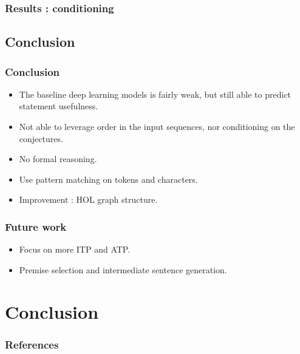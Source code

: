 \documentclass[11pt,handout]{beamer}
\begin{document}
\begin{frame}
  \frametitle{Results : conditioning}
  \begin{figure}[h]
    \centering
  \end{figure}
\end{frame}

\subsection[Conclusion]{Conclusion}

\begin{frame}
  \frametitle{Conclusion}
  \begin{itemize}
  \item The baseline deep learning models is fairly weak, but still able to
    predict statement usefulness.
  \item Not able to leverage order in the input sequences, nor conditioning on
    the conjectures.
  \item No formal reasoning.
  \item Use pattern matching on tokens and characters.
  \item Improvement : HOL graph structure.
  \end{itemize}
\end{frame}

\begin{frame}
  \frametitle{Future work}
  \begin{itemize}
  \item Focus on more ITP and ATP.
  \item Premise selection and intermediate sentence generation.
  \end{itemize}
\end{frame}

\section[Conclusion]{Conclusion}

\begin{frame}
\frametitle{References}
\printbibliography
\end{frame}
\end{document}
